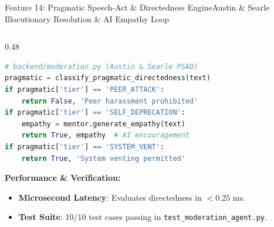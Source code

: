 \documentclass[aspectratio=169,10pt]{beamer}
\begin{document}
\begin{frame}[fragile,t]{Feature 14: Pragmatic Speech-Act \& Directedness Engine}{Austin \& Searle Illocutionary Resolution \& AI Empathy Loop}
\begin{columns}[t]
\begin{column}{0.48\textwidth}
\begin{lstlisting}[language=Python]
# backend/moderation.py (Austin & Searle PSAD)
pragmatic = classify_pragmatic_directedness(text)
if pragmatic['tier'] == 'PEER_ATTACK':
    return False, 'Peer harassment prohibited'
if pragmatic['tier'] == 'SELF_DEPRECATION':
    empathy = mentor.generate_empathy(text)
    return True, empathy  # AI encouragement
if pragmatic['tier'] == 'SYSTEM_VENT':
    return True, 'System venting permitted'
\end{lstlisting}
      \vspace{0.08cm}
      {\fontsize{8.0}{10.0}\selectfont\textbf{\textcolor{KoinexaOrange}{Performance \& Verification:}}}
      \begin{itemize}\setlength{\itemsep}{0.8pt}
        \item {\fontsize{7.5}{9.2}\selectfont \textbf{Microsecond Latency}: Evaluates directedness in $< 0.25$ ms.}
        \item {\fontsize{7.5}{9.2}\selectfont \textbf{Test Suite}: 10/10 test cases passing in \texttt{test\_moderation\_agent.py}.}
      \end{itemize}
    \end{column}
  \end{columns}
\end{frame}
\end{document}
